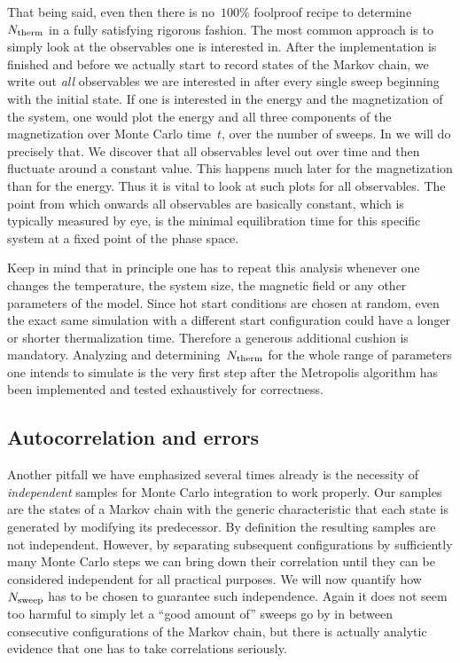 That being said, even then there is no~$100$\% foolproof recipe to
determine~$N_{\mathrm{therm}}$ in a fully satisfying rigorous fashion. The most common
approach is to simply look at the observables one is interested in. After the
implementation is finished and before we actually start to record states of the
Markov chain, we write out \emph{all} observables we are interested in after
every single sweep beginning with the initial state. If one is interested in the
energy and the magnetization of the system, one would plot the energy and all
three components of the magnetization over Monte Carlo time~$t$, \ie{} over the
number of sweeps. In  we will do precisely that. We discover
that all observables level out over time and then fluctuate around a constant
value. This happens much later for the magnetization than for the energy. Thus
it is vital to look at such plots for all observables. The point from which
onwards all observables are basically constant, which is typically measured by
eye, is the minimal equilibration time for this specific system at a fixed point
of the phase space.

Keep in mind that in principle one has to repeat this analysis whenever one
changes the temperature, the system size, the magnetic field or any other
parameters of the model. Since hot start conditions are chosen at random, even
the exact same simulation with a different start configuration could have a
longer or shorter thermalization time. Therefore a generous additional cushion
is mandatory. Analyzing and determining~$N_{\mathrm{therm}}$ for the whole range of
parameters one intends to simulate is the very first step after the Metropolis
algorithm has been implemented and tested exhaustively for correctness.

\subsection{Autocorrelation and errors}

Another pitfall we have emphasized several times already is the necessity of
\emph{independent} samples for Monte Carlo integration to work properly. Our
samples are the states of a Markov chain with the generic characteristic that
each state is generated by modifying its predecessor. By definition the
resulting samples are not independent. However, by separating subsequent
configurations by sufficiently many Monte Carlo steps we can bring down their
correlation until they can be considered independent for all practical purposes.
We will now quantify how~$N_{\mathrm{sweep}}$ has to be chosen to guarantee such
independence. Again it does not seem too harmful to simply let a ``good amount
of'' sweeps go by in between consecutive configurations of the Markov chain, but
there is actually analytic evidence that one has to take correlations seriously.

